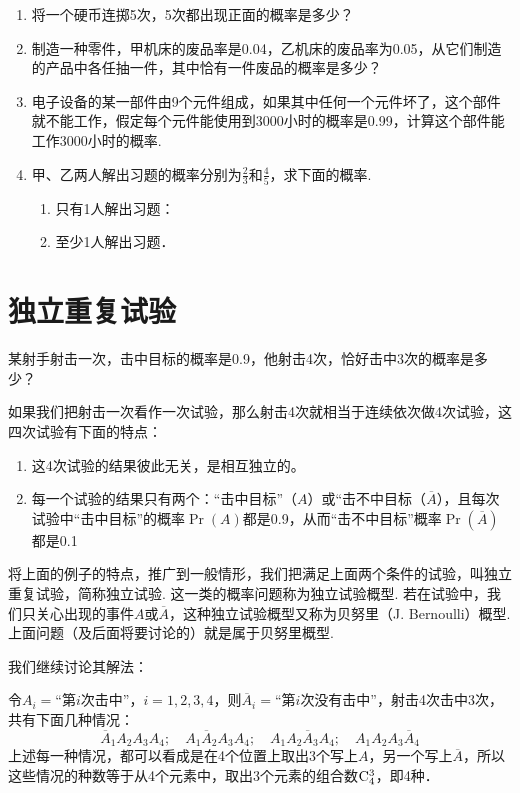 \begin{enumerate}
\item 将一个硬币连掷5次，5次都出现正面的概率是多少？
\item 制造一种零件，甲机床的废品率是0.04，乙机床的废品率为0.05，从它们制造的产品中各任抽一件，其中恰有一件废品的概率是多少？
\item 电子设备的某一部件由9个元件组成，如果其中任何一个元件坏了，这个部件就不能工作，假定每个元件能使用到3000小时的概率是0.99，计算这个部件能工作3000小时的概率.
\item 甲、乙两人解出习题的概率分别为$\frac{2}{3}$和$\frac{4}{5}$，求下面的概率.
\begin{multicols}{2}
\begin{enumerate}[(1)]
    \item 只有1人解出习题：
    \item 至少1人解出习题．
\end{enumerate}
\end{multicols}


\end{enumerate}


\section{独立重复试验}
某射手射击一次，击中目标的概率是0.9，他射击4次，恰好击中3次的概率是多少？

如果我们把射击一次看作一次试验，那么射击4次就相当于连续依次做4次试验，这四次试验有下面的特点：
\begin{enumerate}[(1)]
    \item 这4次试验的结果彼此无关，是相互独立的。
    \item 每一个试验的结果只有两个：“击中目标”（$A$）或“击不中目标（$\overline{A}$），且每次试验中“击中目标”的概率$\Pr(A)$都是0.9，从而“击不中目标”概率$\Pr(\overline{A})$都是0.1
\end{enumerate}

将上面的例子的特点，推广到一般情形，我们把满足上面两个条件的试验，叫独立重复试验，简称独立试验. 这一类的概率问题称为独立试验概型. 若在试验中，我们只关心出现的事件$A$或$\overline{A}$，这种独立试验概型又称为贝努里（J. Bernoulli）概型. 上面问题（及后面将要讨论的）就是属于贝努里概型.

我们继续讨论其解法：

令${A}_i=$“第$i$次击中”，$i=1,2,3,4$，则$\overline{A}_i=$“第$i$次没有击中”，射击4次击中3次，共有下面几种情况：
\[\overline{A}_1A_2A_3A_4;\quad A_1\overline{A}_2A_3A_4;\quad A_1A_2\overline{A}_3A_4;\quad A_1A_2A_3\overline{A}_4\]
上述每一种情况，都可以看成是在4个位置上取出3个写上$A$，另一个写上$\overline{A}$，所以这些情况的种数等于从4个元素中，取出3个元素的组合数${\rm C}^{3}_{4}$，即4种．

